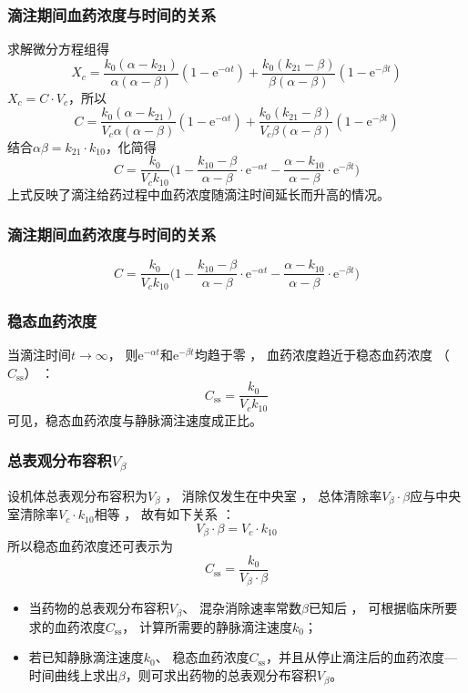 \documentclass[dvipsnames, svgnames, x11names]{beamer}
\begin{document}
\begin{frame}
    \frametitle{滴注期间血药浓度与时间的关系}
    求解微分方程组得
    \[
        X_{c} = \frac{k_{0}(\alpha - k_{21})}{\alpha(\alpha - \beta)}(1-\mathrm{e}^{-\alpha t}) + \frac{k_{0}(k_{21}- \beta)}{\beta(\alpha - \beta)} (1-\mathrm{e}^{-\beta t})
    \]
    $X_{c} = C\cdot V_{c}$，所以
    \[
        C = \frac{k_{0}(\alpha - k_{21})}{V_{c}\alpha(\alpha - \beta)}(1-\mathrm{e}^{-\alpha t}) + \frac{k_{0}(k_{21}- \beta)}{V_{c}\beta(\alpha - \beta)} (1-\mathrm{e}^{-\beta t})
    \]
    结合$\alpha  \beta = k_{21}\cdot k_{10}$，化简得
    \[
        C=\frac{k_{0}}{V_{c}k_{{10}}}\Big(1-\frac{k_{{10}}-\beta}{\alpha-\beta}\cdot \mathrm{e}^{-\alpha t}-\frac{\alpha-k_{{10}}}{\alpha-\beta} \cdot \mathrm{e}^{-\beta t}\Big)
    \]
    上式反映了滴注给药过程中血药浓度随滴注时间延长而升高的情况。 
\end{frame}


\begin{frame}
    \frametitle{滴注期间血药浓度与时间的关系}
    \huge
    \[
        C=\frac{k_{0}}{V_{c}k_{{10}}}\Big(1-\frac{k_{{10}}-\beta}{\alpha-\beta}\cdot \mathrm{e}^{-\alpha t}-\frac{\alpha-k_{{10}}}{\alpha-\beta} \cdot \mathrm{e}^{-\beta t}\Big)
    \]
\end{frame}


\begin{frame}
    \frametitle{稳态血药浓度}
    当滴注时间$t \to \infty$， 则$\mathrm{e}^{-\alpha t}$和$\mathrm{e}^{-\beta t}$均趋于零 ， 血药浓度趋近于稳态血药浓度 （$C_\mathrm{ss}$） ：
    {\huge
    \[
        C_\mathrm{ss} = \frac{k_0}{V_{c}k_{10}}
    \]}
    可见，稳态血药浓度与静脉滴注速度成正比。
\end{frame}


\begin{frame}
    \frametitle{总表观分布容积$V_\beta$}
    设机体总表观分布容积为$V_\beta$ ， 消除仅发生在中央室 ， 总体清除率$V_\beta \cdot \beta$应与中央室清除率$V_{c}\cdot k_{10}$相等 ， 故有如下关系 ：
    \[
        V_\beta \cdot \beta = V_{c}\cdot k_{10}
    \]
    所以稳态血药浓度还可表示为
    \[
        C_\mathrm{ss} = \frac{k_0}{V_\beta \cdot \beta}
    \]
    \begin{itemize}
      \item 当药物的总表观分布容积$V_\beta$、 混杂消除速率常数$\beta$已知后 ， 可根据临床所要求的血药浓度$C_\mathrm{ss}$， 计算所需要的静脉滴注速度$k_{0}$；
      \item 若已知静脉滴注速度$k_{0}$、 稳态血药浓度$C_\mathrm{ss}$，并且从停止滴注后的血药浓度---时间曲线上求出$\beta$，则可求出药物的总表观分布容积$V_\beta$。
    \end{itemize}
\end{frame}
\end{document}
